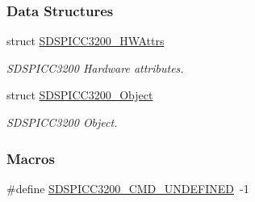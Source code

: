 \subsubsection*{Data Structures}
\begin{DoxyCompactItemize}
\item 
struct \hyperlink{struct_s_d_s_p_i_c_c3200___h_w_attrs}{S\-D\-S\-P\-I\-C\-C3200\-\_\-\-H\-W\-Attrs}
\begin{DoxyCompactList}\small\item\em S\-D\-S\-P\-I\-C\-C3200 Hardware attributes. \end{DoxyCompactList}\item 
struct \hyperlink{struct_s_d_s_p_i_c_c3200___object}{S\-D\-S\-P\-I\-C\-C3200\-\_\-\-Object}
\begin{DoxyCompactList}\small\item\em S\-D\-S\-P\-I\-C\-C3200 Object. \end{DoxyCompactList}\end{DoxyCompactItemize}
\subsubsection*{Macros}
\begin{DoxyCompactItemize}
\item 
\#define \hyperlink{_s_d_s_p_i_c_c3200_8h_abe8d67e530990ee0c3af10f83acf616f}{S\-D\-S\-P\-I\-C\-C3200\-\_\-\-C\-M\-D\-\_\-\-U\-N\-D\-E\-F\-I\-N\-E\-D}~-\/1
\end{DoxyCompactItemize}
